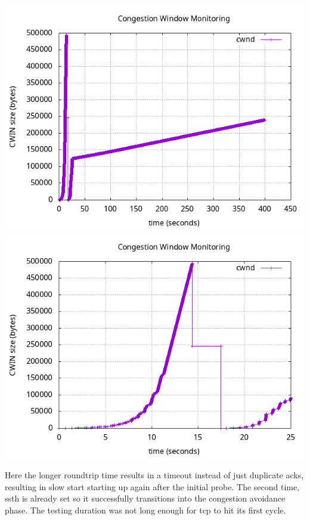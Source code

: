 \documentclass{article}
\begin{document}
\includegraphics[scale=0.5]{plots/lab1-group5-task1-experimentC-question1.3.png}
\includegraphics[scale=0.5]{plots/lab1-group5-task1-experimentC-question1.3-xrange-0-25.png}

Here the longer roundtrip time results in a timeout instead of just duplicate acks, resulting in slow start starting up again after the initial probe. The second time, ssth is already set so it successfully transitions into the congestion avoidance phase. The testing duration was not long enough for tcp to hit its first cycle.
\end{document}
